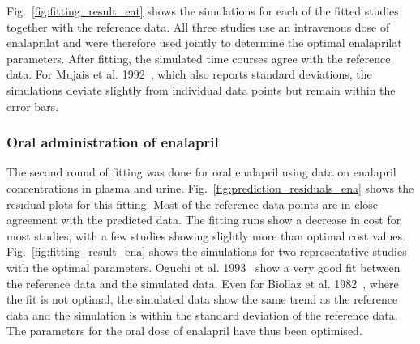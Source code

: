 \documentclass[pharmaceutics,article,submit,pdftex,moreauthors]{Definitions/mdpi}
\begin{document}
Fig.~\ref{fig:fitting_result_eat} shows the simulations for each of the fitted studies together with the reference data. All three studies use an intravenous dose of enalaprilat and were therefore used jointly to determine the optimal enalaprilat parameters. After fitting, the simulated time courses agree with the reference data. For Mujais et al. 1992~\cite{Mujais1992}, which also reports standard deviations, the simulations deviate slightly from individual data points but remain within the error bars.

\subsubsection{Oral administration of enalapril}


The second round of fitting was done for oral enalapril using data on enalapril concentrations in plasma and urine. Fig.~\ref{fig:prediction_residuals_ena} shows the residual plots for this fitting. Most of the reference data points are in close agreement with the predicted data. The fitting runs show a decrease in cost for most studies, with a few studies showing slightly more than optimal cost values. Fig.~\ref{fig:fitting_result_ena} shows the simulations for two representative studies with the optimal parameters. Oguchi et al. 1993~\cite{Oguchi1993} show a very good fit between the reference data and the simulated data. Even for Biollaz et al. 1982~\cite{Biollaz1982}, where the fit is not optimal, the simulated data show the same trend as the reference data and the simulation is within the standard deviation of the reference data. The parameters for the oral dose of enalapril have thus been optimised. 

\end{document}
